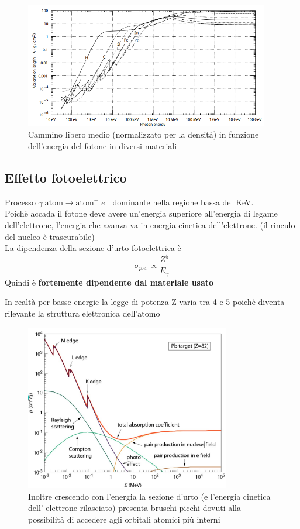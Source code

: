 \begin{figure}[H]
    \centering
    \includegraphics[width=0.95\textwidth,frame]{Chapters/images/Interazione_radiazione_materia/image-20220220113210434.png}
    \captionsetup{width=0.95\linewidth}
    \caption{Cammino libero medio (normalizzato per la densità) in funzione dell'energia del fotone in diversi materiali}
    \label{fig:freemeanpath}
\end{figure}
\subsection{Effetto fotoelettrico}
Processo $\gamma \; \text{atom} \to \text{atom}^+ \; e^-$ dominante nella regione bassa del KeV.
\\
Poichè accada il fotone deve avere un'energia superiore all'energia di legame dell'elettrone, l'energia che avanza va in energia cinetica dell'elettrone. (il rinculo del nucleo è trascurabile)
\\
La dipendenza della sezione d'urto fotoelettrica è
\[\sigma_{p.e.} \propto \frac{Z^5}{E_\gamma}\]
Quindi è \textbf{fortemente dipendente dal materiale usato}
\begin{details}
    In realtà per basse energie la legge di potenza Z varia tra 4 e 5 poichè diventa rilevante la struttura elettronica dell'atomo
\end{details}
\begin{figure}[H]
    \centering
    \includegraphics[width=0.8\textwidth,frame]{Chapters/images/Interazione_radiazione_materia/image-20220220120913778.png}
    \captionsetup{width=0.8\linewidth}
    \caption{Inoltre crescendo con l'energia la sezione d'urto (e l'energia cinetica dell' elettrone rilasciato) presenta bruschi picchi dovuti alla possibilità di accedere agli orbitali atomici più interni}
    \label{fig:gammacrossec}
\end{figure}
